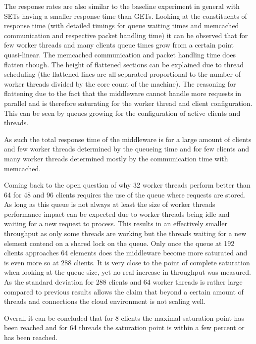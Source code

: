             The response rates are also similar to the baseline experiment in general with SETs having a smaller
            response time than GETs. Looking at the constituents of response time (with detailed timings for queue
            waiting times and memcached communication and respective packet handling time) it can be observed that for
            few worker threads and many clients queue times grow from a certain point quasi-linear. The memcached
            communication and packet handling time does flatten though. The height of flattened sections can be
            explained due to thread scheduling (the flattened lines are all separated proportional to the number of
            worker threads divided by the core count of the machine). The reasoning for flattening due to the fact that
            the middleware cannot handle more requests in parallel and is therefore saturating for the worker thread and
            client configuration. This can be seen by queues growing for the configuration of active clients and
            threads.

            As such the total response time of the middleware is for a large amount of clients and few worker threads
            determined by the queueing time and for few clients and many worker threads determined mostly by the
            communication time with memcached.

            Coming back to the open question of why 32 worker threads perform better than 64 for 48 and 96 clients
            requires the use of the queue where requests are stored. As long as this queue is not always at least the
            size of worker threads performance impact can be expected due to worker threads being idle and waiting for a
            new request to process. This results in an effectively smaller throughput as only some threads are working
            but the threads waiting for a new element contend on a shared lock on the queue. Only once the queue at 192
            clients approaches 64 elements does the middleware become more saturated and is even more so at 288 clients.
            It is very close to the point of complete saturation when looking at the queue size, yet no real increase in
            throughput was measured. As the standard deviation for 288 clients and 64 worker threads is rather large
            compared to previous results allows the claim that beyond a certain amount of threads and connections the
            cloud environment is not scaling well.

            Overall it can be concluded that for 8 clients the maximal saturation point has been reached
            and for 64 threads the saturation point is within a few percent or has been reached.

